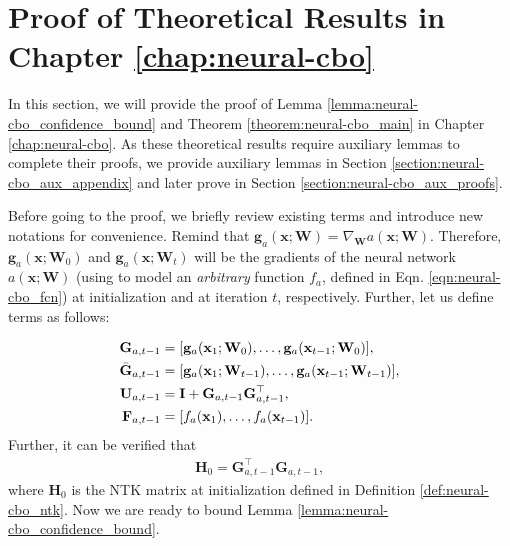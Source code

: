 \section{Proof of Theoretical Results in Chapter \ref{chap:neural-cbo}}
\label{section:neural-cbo_appendix}

In this section, we will provide the proof of Lemma \ref{lemma:neural-cbo_confidence_bound} and Theorem \ref{theorem:neural-cbo_main} in Chapter \ref{chap:neural-cbo}. As these theoretical results require auxiliary lemmas to complete their proofs, we provide auxiliary lemmas in Section \ref{section:neural-cbo_aux_appendix} and later prove in Section \ref{section:neural-cbo_aux_proofs}. 

Before going to the proof, we briefly review existing terms and introduce new notations for convenience.
Remind that $\mathbf{g}_{a}(\mathbf{x}; \mathbf{W}) = \nabla_{\mathbf{W}}a(\mathbf{x}; \mathbf{W})$. Therefore, $\mathbf{g}_{a}(\mathbf{x}; \mathbf{W}_0)$ and $\mathbf{g}_{a}(\mathbf{x}; \mathbf{W}_t)$ will be the gradients of the neural network $a(\mathbf{x}; \mathbf{W})$ (using to model an \textit{arbitrary} function $f_a$, defined in Eqn. \eqref{eqn:neural-cbo_fcn}) at initialization and at iteration $t$, respectively.  Further, let us define terms as follows:

\begin{align}  
\mathbf{G}_{a,t-1} & = [\mathbf{g}_{a}(\mathbf{x}_1; \mathbf{W}_0),\dots, \mathbf{g}_{a}(\mathbf{x}_{t-1}; \mathbf{W}_0)],   \label{def:neural_cbo_linear_kernelized_terms_1}
\\
\Bar{\mathbf{G}}_{a,t-1} & = [\mathbf{g}_{a}(\mathbf{x}_1; \mathbf{W}_{t-1}),\dots, \mathbf{g}_{a}(\mathbf{x}_{t-1}; \mathbf{W}_{t-1})],  \label{def:neural_cbo_linear_kernelized_terms_2}
\\
\mathbf{U}_{a,t-1} &=  \mathbf{I} + \mathbf{G}_{a,t-1} \mathbf{G}_{a,t-1}^\top, \label{def:neural_cbo_linear_kernelized_terms_3}
\\
\mathbf{F}_{a,t-1} &= [f_a(\mathbf{x}_1), \dots, f_a(\mathbf{x}_{t-1})].  \label{def:neural_cbo_linear_kernelized_terms_4}
\end{align}
Further, it can be verified that 
\begin{align}
    \label{def:neural_cbo_H0}
    \mathbf{H}_0 = \mathbf{G}_{a,t-1} ^\top\mathbf{G}_{a,t-1}, 
\end{align}
where $\mathbf{H}_0$ is the NTK matrix at initialization defined in Definition \ref{def:neural-cbo_ntk}.  Now we are ready to bound Lemma \ref{lemma:neural-cbo_confidence_bound}.
